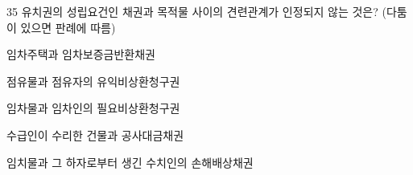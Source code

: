 \begin{question}{35}
유치권의 성립요건인 채권과 목적물 사이의 견련관계가 인정되지 않는 것은? (다툼이 있으면 판례에 따름)
\begin{choices}
  \item 임차주택과 임차보증금반환채권
  \item 점유물과 점유자의 유익비상환청구권
  \item 임차물과 임차인의 필요비상환청구권
  \item 수급인이 수리한 건물과 공사대금채권
  \item 임치물과 그 하자로부터 생긴 수치인의 손해배상채권
\end{choices}
\end{question}
